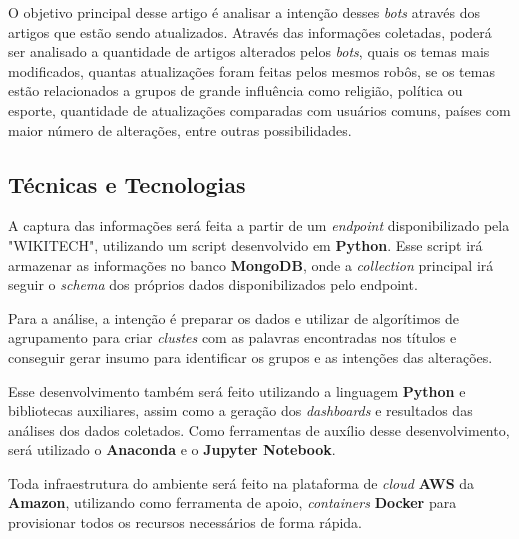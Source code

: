 \documentclass[a4paper, 12pt]{article}
\begin{document}
O objetivo principal desse artigo é analisar a intenção desses \textit{bots} através dos artigos que estão sendo atualizados.
Através das informações coletadas, poderá ser analisado a quantidade de artigos alterados pelos \textit{bots}, quais os temas mais modificados, quantas atualizações foram feitas pelos mesmos robôs, se os temas estão relacionados a grupos de grande influência como religião, política ou esporte, quantidade de atualizações comparadas com usuários comuns, países com maior número de alterações, entre outras possibilidades.

\subsection{Técnicas e Tecnologias}

A captura das informações será feita a partir de um \textit{endpoint} disponibilizado pela "WIKITECH"\cite{Wikitech}, utilizando um script desenvolvido em \textbf{Python}. Esse script irá armazenar as informações no banco \textbf{MongoDB}, onde a \textit{collection} principal irá seguir o \textit{schema} dos próprios dados disponibilizados pelo endpoint\cite{schema}.

Para a análise, a intenção é preparar os dados e utilizar de algorítimos de agrupamento\cite{book1} para criar \textit{clustes} com as palavras encontradas nos títulos e conseguir gerar insumo para identificar os grupos e as intenções das alterações. 

Esse desenvolvimento também será feito utilizando a linguagem \textbf{Python} e bibliotecas auxiliares, assim como a geração dos \textit{dashboards} e resultados das análises dos dados coletados. Como ferramentas de auxílio desse desenvolvimento, será utilizado o \textbf{Anaconda} e o \textbf{Jupyter Notebook}.

Toda infraestrutura do ambiente será feito na plataforma de \textit{cloud} \textbf{AWS} da \textbf{Amazon}, utilizando como ferramenta de apoio, \textit{containers} \textbf{Docker} para provisionar todos os recursos necessários de forma rápida.

\newpage



\end{document}
